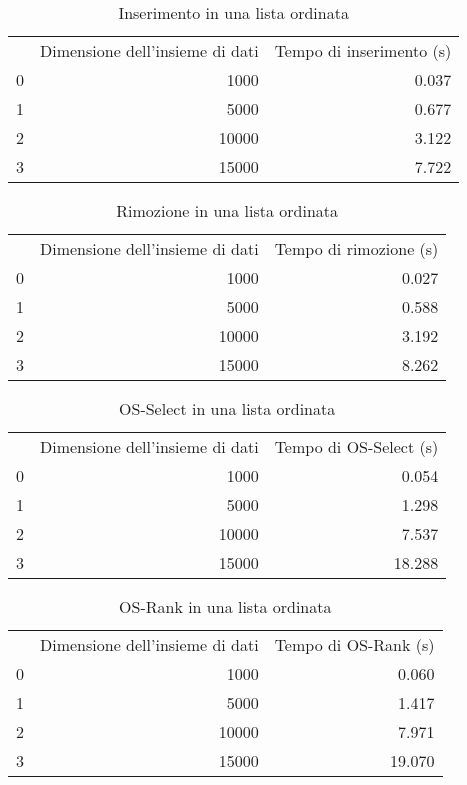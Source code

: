\begin{table}
\centering
\caption{Inserimento in una lista ordinata}
\label{Inserimento in una lista ordinata}
\begin{tabular}{rrr}
 & Dimensione dell'insieme di dati & Tempo di inserimento (s) \\
0 & 1000 & 0.037 \\
\cline{1-3}
1 & 5000 & 0.677 \\
\cline{1-3}
2 & 10000 & 3.122 \\
\cline{1-3}
3 & 15000 & 7.722 \\
\cline{1-3}
\end{tabular}
\end{table}

\begin{table}
\centering
\caption{Rimozione in una lista ordinata}
\label{Rimozione in una lista ordinata}
\begin{tabular}{rrr}
 & Dimensione dell'insieme di dati & Tempo di rimozione (s) \\
0 & 1000 & 0.027 \\
\cline{1-3}
1 & 5000 & 0.588 \\
\cline{1-3}
2 & 10000 & 3.192 \\
\cline{1-3}
3 & 15000 & 8.262 \\
\cline{1-3}
\end{tabular}
\end{table}

\begin{table}
\centering
\caption{OS-Select in una lista ordinata}
\label{OS-Select in una lista ordinata}
\begin{tabular}{rrr}
 & Dimensione dell'insieme di dati & Tempo di OS-Select (s) \\
0 & 1000 & 0.054 \\
\cline{1-3}
1 & 5000 & 1.298 \\
\cline{1-3}
2 & 10000 & 7.537 \\
\cline{1-3}
3 & 15000 & 18.288 \\
\cline{1-3}
\end{tabular}
\end{table}

\begin{table}
\centering
\caption{OS-Rank in una lista ordinata}
\label{OS-Rank in una lista ordinata}
\begin{tabular}{rrr}
 & Dimensione dell'insieme di dati & Tempo di OS-Rank (s) \\
0 & 1000 & 0.060 \\
\cline{1-3}
1 & 5000 & 1.417 \\
\cline{1-3}
2 & 10000 & 7.971 \\
\cline{1-3}
3 & 15000 & 19.070 \\
\cline{1-3}
\end{tabular}
\end{table}
